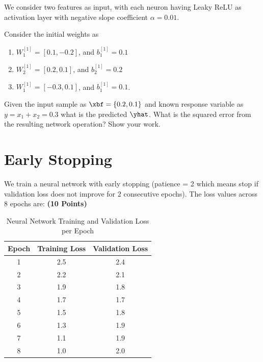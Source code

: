 \documentclass[12pt, xcolor=dvipsnames,svgnames,x11names]{article}
\begin{document}
We consider two features as input, with each neuron having Leaky ReLU as activation layer with negative slope coefficient $\alpha = 0.01$.

Consider the initial weights as

\begin{enumerate}
\item $W_1^{[1]} = [0.1, -0.2]$, and $b_1^{[1]} = 0.1$
\item $W_2^{[1]} = [0.2, 0.1]$, and $b_2^{[1]} = 0.2$
\item $W_1^{[1]} = [-0.3, 0.1]$, and $b_1^{[1]} = 0.1$.

\end{enumerate}

Given the input sample as $ \xbf = \{0.2, 0.1\}$ and known response variable as $y = x_1 + x_2 = 0.3$ what is the predicted $\yhat$. What is the squared error from the resulting network operation? Show your work.


\newpage



\section{Early Stopping} We train a neural network with early stopping (patience = 2 which means stop if validation loss does not improve for 2 consecutive epochs). The loss values across 8 epochs are: \hfill \textbf{(10 Points)}

\begin{table}[h]
    \centering
    \caption{Neural Network Training and Validation Loss per Epoch}
    \label{tab:loss_history}
    \vspace{10pt}
  
    \begin{tabular}{ccc}
        \toprule
        \textbf{Epoch} & \textbf{Training Loss} & \textbf{Validation Loss} \\
        \midrule
        1 & 2.5 & 2.4 \\
        2 & 2.2 & 2.1 \\
        3 & 1.9 & 1.8 \\
        4 & 1.7 & 1.7 \\
        5 & 1.5 & 1.8 \\
        6 & 1.3 & 1.9 \\
        7 & 1.1 & 1.9 \\
        8 & 1.0 & 2.0 \\
        \bottomrule
    \end{tabular}
\end{table}
\end{document}
